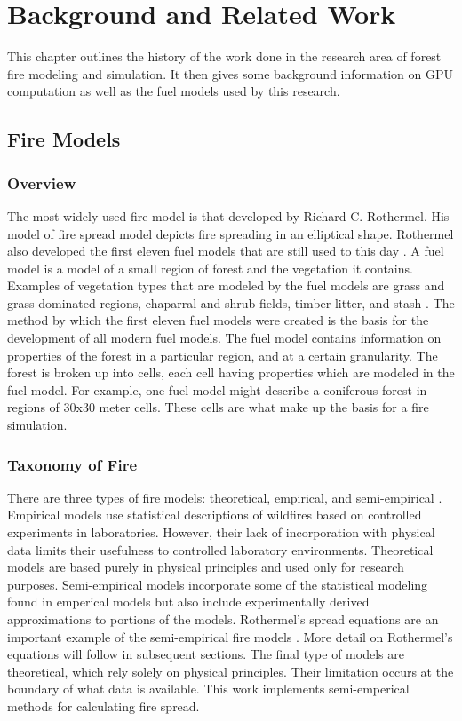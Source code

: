 \chapter{Background and Related Work}
\label{chapter:background}
This chapter outlines the history of the work done in the research area of forest fire modeling and simulation. It then gives some background information on GPU computation as well as the fuel models used by this research.

\section{Fire Models}
\subsection{Overview}
The most widely used fire model is that developed by Richard C. Rothermel. His model of fire spread model depicts fire spreading in an elliptical shape. Rothermel also developed the first eleven fuel models that are still used to this day \cite{roth}. A fuel model is a model of a small region of forest and the vegetation it contains. Examples of vegetation types that are modeled by the fuel models are grass and grass-dominated regions, chaparral and shrub fields, timber litter, and stash \cite{1983roth}. The method by which the first eleven fuel models were created is the basis for the development of all modern fuel models. The fuel model contains information on properties of the forest in a particular region, and at a certain granularity. The forest is broken up into cells, each cell having properties which are modeled in the fuel model. For example, one fuel model might describe a coniferous forest in regions of 30x30 meter cells. These cells are what make up the basis for a fire simulation. 

\subsection{Taxonomy of Fire}
There are three types of fire models: theoretical, empirical, and semi-empirical \cite{firereview,firereview2}. Empirical models use statistical descriptions of wildfires based on controlled experiments in laboratories. However, their lack of incorporation with physical data limits their usefulness to controlled laboratory environments. Theoretical models are based purely in physical principles and used only for research purposes. Semi-empirical models incorporate some of the statistical modeling found in emperical models but also include experimentally derived approximations to portions of the models. Rothermel's spread equations are an important example of the semi-empirical fire models \cite{roth}. More detail on Rothermel's equations will follow in subsequent sections. The final type of models are theoretical, which rely solely on physical principles. Their limitation occurs at the boundary of what data is available. This work implements semi-emperical methods for calculating fire spread.

